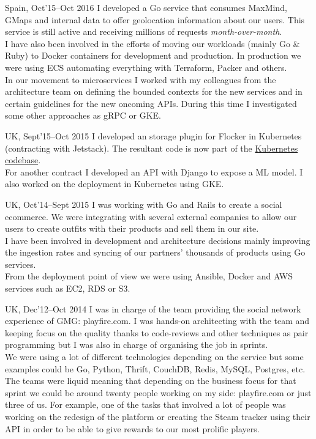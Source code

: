 \documentclass[10pt, a4paper, sans]{moderncv}
\begin{document}
{Spain, Oct'15--Oct 2016}
{I developed a Go service that consumes MaxMind, GMaps and internal data to offer geolocation information about our users.
This service is still active and receiving millions of requests \textit{month-over-month}.\\
I have also been involved in the efforts of moving our workloads (mainly Go \& Ruby) to Docker containers for development and production.
In production we were using ECS automating everything with Terraform, Packer and others.\\
In our movement to microservices I worked with my colleagues from the architecture team on defining the bounded contexts for the new services and in certain guidelines for the new oncoming APIs.
During this time I investigated some other approaches as gRPC or GKE.\\}

{UK, Sept'15--Oct 2015}
{I developed an storage plugin for Flocker in Kubernetes (contracting with Jetstack). The resultant code is now part of the \href{https://github.com/kubernetes/kubernetes/pull/14328}{Kubernetes codebase}.\\
For another contract I developed an API with Django to expose a ML model. I also worked on the deployment in Kubernetes using GKE.\\}

{UK, Oct'14--Sept 2015}
{I was working with Go and Rails to create a social ecommerce. We were integrating with several external companies to allow our users to create outfits with their products and sell them in our site.\\
I have been involved in development and architecture decisions mainly improving the ingestion rates and syncing of our partners' thousands of products using Go services.\\
From the deployment point of view we were using Ansible, Docker and AWS services such as EC2, RDS or S3.\\}

{UK, Dec'12--Oct 2014}
{I was in charge of the team providing the social network experience of GMG: playfire.com. I was hands-on architecting with the team and keeping focus on the quality thanks to code-reviews and other techniques as pair programming but I was also in charge of organising the job in sprints.\\
We were using a lot of different technologies depending on the service but some examples could be Go, Python, Thrift, CouchDB, Redis, MySQL, Postgres, etc.\\
The teams were liquid meaning that depending on the business focus for that sprint we could be around twenty people working on my side: playfire.com or just three of us.
For example, one of the tasks that involved a lot of people was working on the redesign of the platform or creating the Steam tracker using their API in order to be able to give rewards to our most prolific players.\\}
\end{document}
